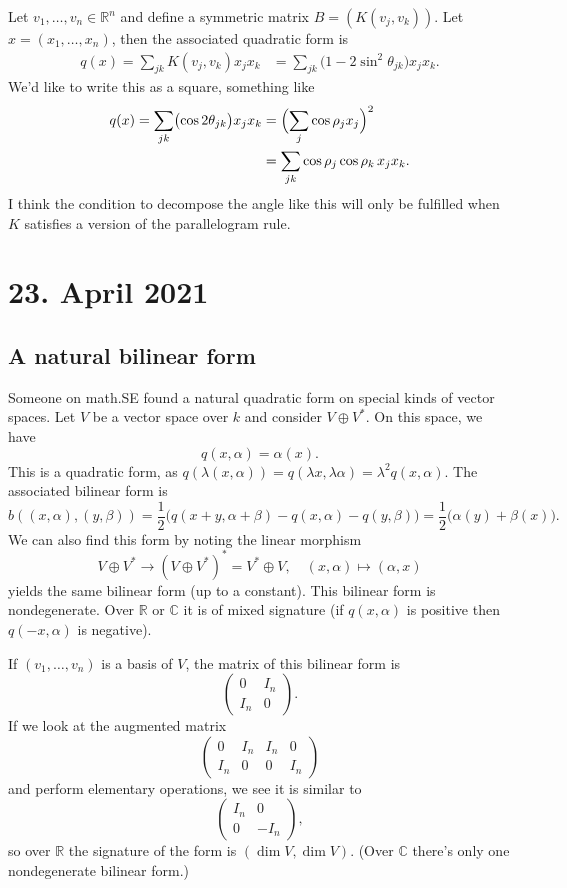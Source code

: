 \documentclass[11pt]{amsart}
\theoremstyle{definition}
\newcommand{\kk}[1]{\mathbb{#1}}
\begin{document}
Let $v_1, \ldots, v_n \in \kk R^n$ and define a symmetric matrix $B = (K(v_j, v_k))$. Let $x = (x_1, \ldots, x_n)$, then the associated quadratic form is
\begin{align*}
q(x)
= \sum_{jk} K(v_j, v_k) x_j x_k
&= \sum_{jk} \bigl(
1 - 2 \sin^2 \theta_{jk}
\bigr) x_j x_k.
\end{align*}
We'd like to write this as a square, something like
\begin{align*}
q(x) = \sum_{jk} \bigl(\cos 2\theta_{jk} \bigr) x_j x_k
&= \Bigl(\sum_{j} \cos \rho_jx_j \Bigr)^2
\\
&= \sum_{jk} \cos \rho_j\cos \rho_k \, x_j x_k.
\end{align*}
I think the condition to decompose the angle like this will only be fulfilled when $K$ satisfies a version of the parallelogram rule.


\section*{23. April 2021}

\subsection*{A natural bilinear form}

Someone on math.SE found a natural quadratic form on special kinds of vector spaces. Let $V$ be a vector space over $k$ and consider $V \oplus V^*$. On this space, we have
\[
q(x, \alpha) = \alpha(x).
\]
This is a quadratic form, as $q(\lambda(x,\alpha)) = q(\lambda x, \lambda\alpha) = \lambda^2 q(x, \alpha)$. The associated bilinear form is
\[
b((x, \alpha), (y, \beta))
= \frac12\bigl(q(x + y, \alpha + \beta) - q(x, \alpha) - q(y,\beta)\bigr)
= \frac12 \bigl(\alpha(y) + \beta(x)\bigr).
\]
We can also find this form by noting the linear morphism
\[
V \oplus V^* \to (V \oplus V^*)^* = V^* \oplus V,
\quad
(x, \alpha) \mapsto (\alpha, x)
\]
yields the same bilinear form (up to a constant). This bilinear form is
nondegenerate. Over $\kk R$ or $\kk C$ it is of mixed signature (if
$q(x,\alpha)$ is positive then $q(-x,\alpha)$ is negative).

If $(v_1, \ldots, v_n)$ is a basis of $V$, the matrix of this bilinear form is
\[
\begin{pmatrix}
0 & I_n \\
I_n & 0
\end{pmatrix}.
\]
If we look at the augmented matrix
\[
\begin{pmatrix}
0 & I_n & I_n & 0 \\
I_n & 0 & 0 & I_n
\end{pmatrix}
\]
and perform elementary operations, we see it is similar to
\[
\begin{pmatrix}
I_n & 0 \\
0 & -I_n
\end{pmatrix},
\]
so over $\kk R$ the signature of the form is $(\dim V, \dim V)$. (Over $\kk C$ there's only one nondegenerate bilinear form.)
\end{document}
